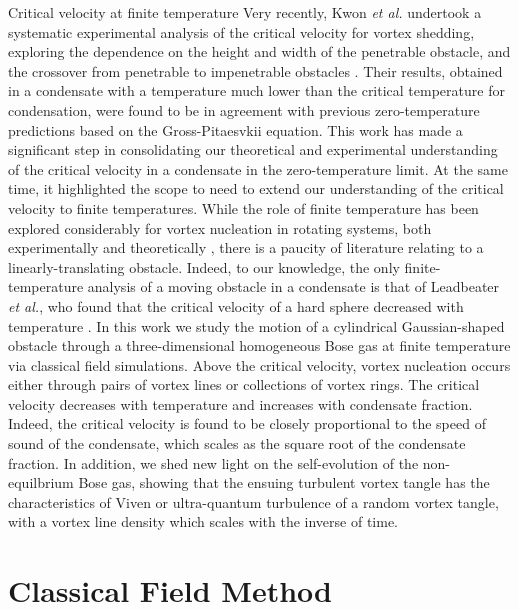 \begin{chapter}{\label{cha:nonequib}Critical velocity at finite temperature}
Very recently, Kwon {\it et al.} undertook a systematic experimental analysis of the critical velocity for vortex shedding, exploring the dependence on the height and width of the penetrable obstacle, and the crossover from penetrable to impenetrable obstacles \cite{kwon_2015a}.  Their results, obtained in a condensate with a temperature much lower than the critical temperature for condensation, were found to be in agreement with previous zero-temperature predictions based on the Gross-Pitaesvkii equation.  This work has made a significant step in consolidating our theoretical and experimental understanding of the critical velocity in a condensate in the zero-temperature limit.  At the same time, it highlighted the scope to need to extend our understanding of the critical velocity to finite temperatures.  While the role of finite temperature has been explored considerably for vortex nucleation in rotating systems, both experimentally \cite{hodby_2002,abo_shaeer_2002} and theoretically \cite{williams_2002,penckwitt_2002,kasamatsu_2003,lobo_2004}, there is a paucity of literature relating to a linearly-translating obstacle.  Indeed, to our knowledge, the only finite-temperature analysis of a moving obstacle in a condensate is that of Leadbeater {\it et al.}, who found that the critical velocity of a hard sphere decreased with temperature \cite{leadbeater_2003}. 
In this work we study the motion of a cylindrical Gaussian-shaped obstacle through a three-dimensional homogeneous Bose gas at finite temperature via classical field simulations.   Above the critical velocity, vortex nucleation occurs either through pairs of vortex lines or collections of vortex rings.  The critical velocity decreases with temperature and increases with condensate fraction.  Indeed, the critical velocity is found to be closely proportional to the speed of sound of the condensate, which scales as the square root of the condensate fraction.  In addition, we shed new light on the self-evolution of the non-equilbrium Bose gas, showing that the ensuing turbulent vortex tangle has the characteristics of Viven or ultra-quantum turbulence of a random vortex tangle, with a vortex line density which scales with the inverse of time.





  \section{Classical Field Method}
\label{sec:theory}


\end{chapter}
